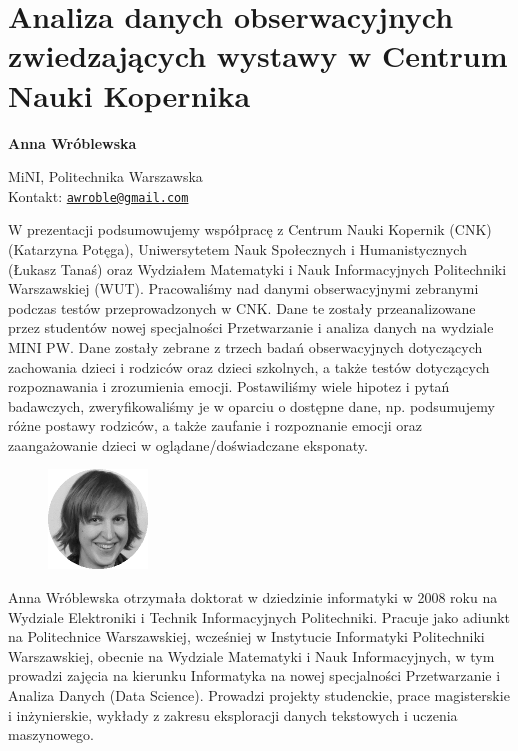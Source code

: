 \documentclass[\main/boa.tex]{subfiles}
\begin{document}
\section{Analiza danych obserwacyjnych zwiedzających wystawy w Centrum Nauki Kopernika}


\begin{minipage}{0.915\textwidth}
	\centering
  {\bf \LARGE {} Anna Wróblewska}
\end{minipage}


\begin{affiliations}
\begin{minipage}{0.915\textwidth}
\centering
\large MiNI, Politechnika Warszawska  \\[1pt]
Kontakt: \href{mailto:awroble@gmail.com}{\nolinkurl{awroble@gmail.com}}\\
\end{minipage}
\end{affiliations}

W prezentacji podsumowujemy współpracę z Centrum Nauki Kopernik (CNK) \break (Katarzyna Potęga), Uniwersytetem Nauk Społecznych i Humanistycznych (Łukasz Tanaś) oraz Wydziałem Matematyki i Nauk Informacyjnych Politechniki Warszawskiej (WUT). Pracowaliśmy nad danymi obserwacyjnymi zebranymi podczas testów przeprowadzonych w CNK. Dane te zostały przeanalizowane przez studentów nowej specjalności \break Przetwarzanie i analiza danych na wydziale MINI PW.
Dane zostały zebrane z trzech badań obserwacyjnych dotyczących zachowania dzieci i rodziców oraz dzieci szkolnych, a także testów dotyczących rozpoznawania i zrozumienia emocji.
Postawiliśmy wiele hipotez i pytań badawczych, zweryfikowaliśmy je w oparciu o dostępne dane, np. podsumujemy różne postawy rodziców, a także zaufanie i rozpoznanie emocji oraz zaangażowanie dzieci w oglądane/doświadczane eksponaty. 

\bio
\begin{figure}
    \includegraphics[width=100px]{img/guests/czarno_biale/awroblewska.png}
\end{figure} 
Anna Wróblewska otrzymała doktorat w dziedzinie informatyki w 2008 roku na Wydziale Elektroniki i Technik Informacyjnych Politechniki. Pracuje jako adiunkt na Politechnice Warszawskiej, wcześniej w Instytucie Informatyki Politechniki Warszawskiej, obecnie na Wydziale Matematyki i Nauk Informacyjnych, w tym prowadzi zajęcia na kierunku Informatyka na nowej specjalności Przetwarzanie i Analiza Danych (Data Science). Prowadzi projekty studenckie, prace magisterskie i inżynierskie, wykłady z zakresu eksploracji danych tekstowych i uczenia maszynowego.
\end{document}
